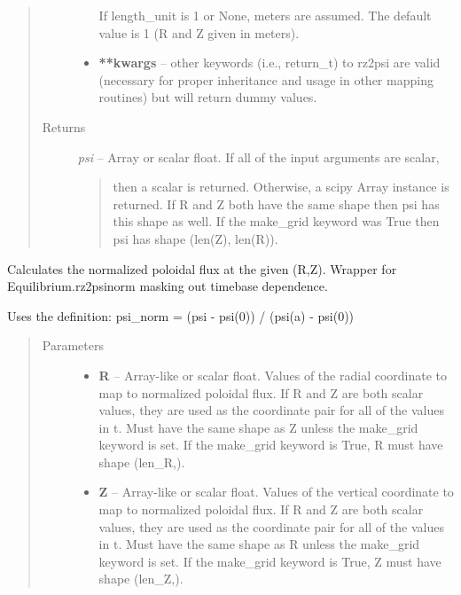 \documentclass[letterpaper,10pt,english]{sphinxmanual}
\begin{document}
\begin{fulllineitems}
\begin{fulllineitems}
\begin{quote}
\begin{description}
\begin{itemize}
If length\_unit is 1 or None, meters are assumed. The default
value is 1 (R and Z given in meters).

\item {} 
\textbf{**kwargs} --
other keywords (i.e., return\_t) to rz2psi are valid
(necessary for proper inheritance and usage in other mapping routines)
but will return dummy values.

\end{itemize}

\item[{Returns}] \leavevmode

\emph{psi} --
Array or scalar float. If all of the input arguments are scalar,
\begin{quote}

then a scalar is returned. Otherwise, a scipy Array instance is
returned. If R and Z both have the same shape then psi has this
shape as well. If the make\_grid keyword was True then psi has
shape (len(Z), len(R)).
\end{quote}


\end{description}\end{quote}

\end{fulllineitems}


\begin{fulllineitems}
\label{eqtools:eqtools.eqdskreader.EqdskReader.rz2psinorm}
Calculates the normalized poloidal flux at the given (R,Z).
Wrapper for Equilibrium.rz2psinorm masking out timebase dependence.

Uses the definition:
psi\_norm = (psi - psi(0)) / (psi(a) - psi(0))
\begin{quote}\begin{description}
\item[{Parameters }] \leavevmode\begin{itemize}
\item {} 
\textbf{R} --
Array-like or scalar float. Values of the radial coordinate to
map to normalized poloidal flux. If R and Z are both scalar
values, they are used as the coordinate pair for all of the
values in t. Must have the same shape as Z unless the make\_grid
keyword is set. If the make\_grid keyword is True, R must have
shape (len\_R,).

\item {} 
\textbf{Z} --
Array-like or scalar float. Values of the vertical coordinate to
map to normalized poloidal flux. If R and Z are both scalar
values, they are used as the coordinate pair for all of the
values in t. Must have the same shape as R unless the make\_grid
keyword is set. If the make\_grid keyword is True, Z must have
shape (len\_Z,).


\end{itemize}
\end{description}
\end{quote}
\end{fulllineitems}
\end{fulllineitems}
\end{document}
